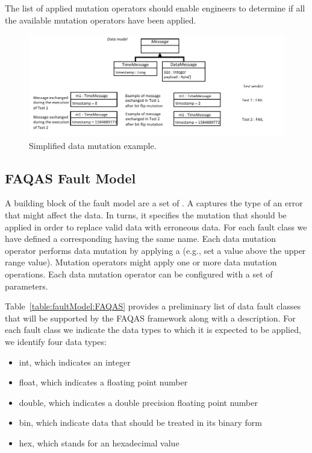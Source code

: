 The list of applied mutation operators should enable engineers to determine if all the available mutation operators have been applied.


\begin{figure}[t!]
  \centering
    \includegraphics{images/DataDrivenSimpleExample}
      \caption{Simplified data mutation example.}
      \label{fig:DataDrivenSimpleExample}
\end{figure}

\clearpage



\clearpage
\subsection{FAQAS Fault Model}
\label{sec:dataModel}
\label{sec:faultModel}





A building block of the fault model are a set of .
A   captures the type of an error that might affect the data. In turns, it specifies the mutation that should be applied in order to replace valid data with erroneous data. For each fault class we have defined a corresponding  having the same name. 
Each {data mutation operator} performs data mutation by applying a  (e.g., set a value above the upper range value). Mutation operators might apply one or more data mutation operations.
Each data mutation operator can be configured with a set of parameters. 

Table~\ref{table:faultModel:FAQAS} provides a preliminary list of data fault classes that will be supported by the FAQAS framework along with a description. For each fault class we indicate the data types to which it is expected to be applied, we identify four data types: 
\begin{itemize}
\item int, which indicates an integer
\item float, which indicates a floating point number
\item double, which indicates a double precision floating point number
\item bin, which indicate data that should be treated in its binary form
\item hex, which stands for an hexadecimal value
\end{itemize}


